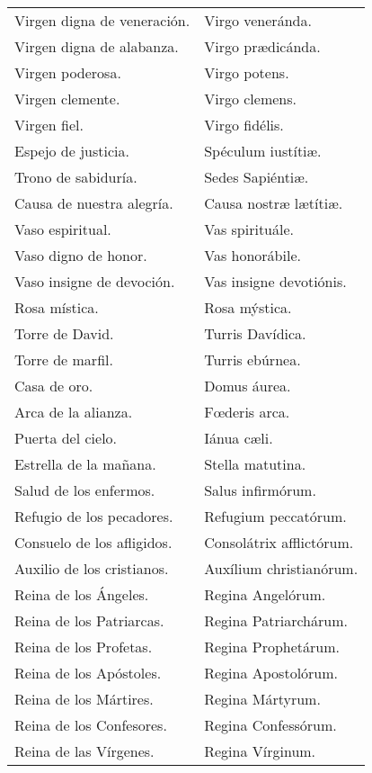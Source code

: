 \documentclass[./devocionario.tex]{subfiles}
\begin{document}
\begin{longtable} { p{} p{} }
        Virgen digna de veneración. & Virgo veneránda.\\
        Virgen digna de alabanza. & Virgo prædicánda.\\
        Virgen poderosa. & Virgo potens.\\
        Virgen clemente. & Virgo clemens.\\
        Virgen fiel. & Virgo fidélis.\\
        Espejo de justicia. & Spéculum iustítiæ.\\
        Trono de sabiduría. & Sedes Sapiéntiæ.\\
        Causa de nuestra alegría. & Causa nostræ lætítiæ.\\
        Vaso espiritual. & Vas spirituále.\\
        Vaso digno de honor. & Vas honorábile.\\
        Vaso insigne de devoción. & Vas insigne devotiónis.\\
        Rosa mística. & Rosa mýstica.\\
        Torre de David. & Turris Davídica.\\
        Torre de marfil. & Turris ebúrnea.\\
        Casa de oro. & Domus áurea.\\
        Arca de la alianza. & Fœderis arca.\\
        Puerta del cielo. & Iánua cæli.\\
        Estrella de la mañana. & Stella matutina.\\
        Salud de los enfermos. & Salus infirmórum.\\
        Refugio de los pecadores. & Refugium peccatórum.\\
        Consuelo de los afligidos. & Consolátrix af­flic­tórum.\\
        Auxilio de los cristianos. & Auxílium chris­tia­nórum.\\
        Reina de los Ángeles. & Regina Angelórum.\\
        Reina de los Patriarcas. & Regina Pa­triar­chárum.\\
        Reina de los Profetas. & Regina Pro­phe­tárum.\\
        Reina de los Apóstoles. & Regina Apos­to­lórum.\\
        Reina de los Mártires. & Regina Mártyrum.\\
        Reina de los Confesores. & Regina Con­fe­ssórum.\\
        Reina de las Vírgenes. & Regina Vírginum.\\

\end{longtable}
\end{document}
